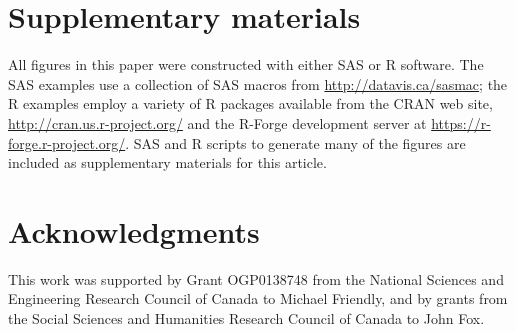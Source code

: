 \documentclass[11pt]{article}%
\begin{document}


\section{Supplementary materials}

All figures in this paper were constructed with either SAS or R software.
The SAS examples use a collection of SAS macros from \url{http://datavis.ca/sasmac}; the
R examples employ a variety of R packages available from the CRAN web site, \url{http://cran.us.r-project.org/}
and the R-Forge development server at \url{https://r-forge.r-project.org/}.
SAS and R scripts to generate many of the figures are included as supplementary materials for this article.


\section{Acknowledgments}

This work was supported by Grant OGP0138748 from the National Sciences and Engineering Research Council of Canada to Michael Friendly, 
and by grants from the Social Sciences and Humanities Research Council of Canada to John Fox.


%
\end{document}
